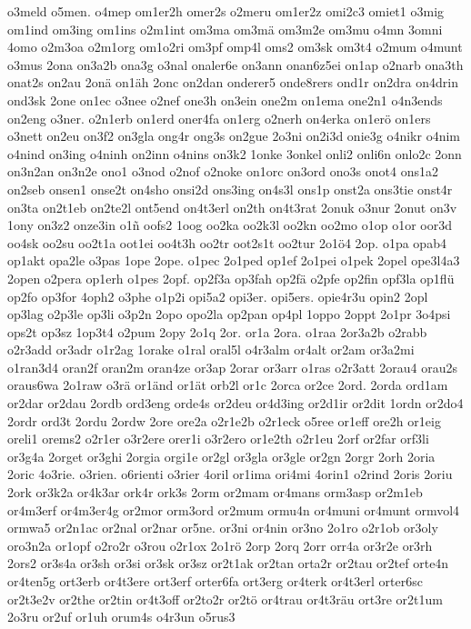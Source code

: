 {o3meld
o5men.
o4mep
om1er2h
omer2s
o2meru
om1er2z
omi2c3
omiet1
o3mig
om1ind
om3ing
om1ins
o2m1int
om3ma
om3mä
om3m2e
om3mu
o4mn
3omni
4omo
o2m3oa
o2m1org
om1o2ri
om3pf
omp4l
oms2
om3sk
om3t4
o2mum
o4munt
o3mus
2ona
on3a2b
ona3g
o3nal
onaler6e
on3ann
onan6z5ei
on1ap
o2narb
ona3th
onat2s
on2au
2onä
on1äh
2onc
on2dan
onderer5
onde8rers
ond1r
on2dra
on4drin
ond3sk
2one
on1ec
o3nee
o2nef
one3h
on3ein
one2m
on1ema
one2n1
o4n3ends
on2eng
o3ner.
o2n1erb
on1erd
oner4fa
on1erg
o2nerh
on4erka
on1erö
on1ers
o3nett
on2eu
on3f2
on3gla
ong4r
ong3s
on2gue
2o3ni
on2i3d
onie3g
o4nikr
o4nim
o4nind
on3ing
o4ninh
on2inn
o4nins
on3k2
1onke
3onkel
onli2
onli6n
onlo2c
2onn
on3n2an
on3n2e
ono1
o3nod
o2nof
o2noke
on1orc
on3ord
ono3s
onot4
ons1a2
on2seb
onsen1
onse2t
on4sho
onsi2d
ons3ing
on4s3l
ons1p
onst2a
ons3tie
onst4r
on3ta
on2t1eb
on2te2l
ont5end
on4t3erl
on2th
on4t3rat
2onuk
o3nur
2onut
on3v
1ony
on3z2
onze3in
o1ñ
oofs2
1oog
oo2ka
oo2k3l
oo2kn
oo2mo
o1op
o1or
oor3d
oo4sk
oo2su
oo2t1a
oot1ei
oo4t3h
oo2tr
oot2s1t
oo2tur
2o1ö4
2op.
o1pa
opab4
op1akt
opa2le
o3pas
1ope
2ope.
o1pec
2o1ped
op1ef
2o1pei
o1pek
2opel
ope3l4a3
2open
o2pera
op1erh
o1pes
2opf.
op2f3a
op3fah
op2fä
o2pfe
op2fin
opf3la
op1flü
op2fo
op3for
4oph2
o3phe
o1p2i
opi5a2
opi3er.
opi5ers.
opie4r3u
opin2
2opl
op3lag
o2p3le
op3li
o3p2n
2opo
opo2la
op2pan
op4pl
1oppo
2oppt
2o1pr
3o4psi
ops2t
op3sz
1op3t4
o2pum
2opy
2o1q
2or.
or1a
2ora.
o1raa
2or3a2b
o2rabb
o2r3add
or3adr
o1r2ag
1orake
o1ral
oral5l
o4r3alm
or4alt
or2am
or3a2mi
o1ran3d4
oran2f
oran2m
oran4ze
or3ap
2orar
or3arr
o1ras
o2r3att
2orau4
orau2s
oraus6wa
2o1raw
o3rä
or1änd
or1ät
orb2l
or1c
2orca
or2ce
2ord.
2orda
ord1am
or2dar
or2dau
2ordb
ord3eng
orde4s
or2deu
or4d3ing
or2d1ir
or2dit
1ordn
or2do4
2ordr
ord3t
2ordu
2ordw
2ore
ore2a
o2r1e2b
o2r1eck
o5ree
or1eff
ore2h
or1eig
oreli1
orems2
o2r1er
o3r2ere
orer1i
o3r2ero
or1e2th
o2r1eu
2orf
or2far
orf3li
or3g4a
2orget
or3ghi
2orgia
orgi1e
or2gl
or3gla
or3gle
or2gn
2orgr
2orh
2oria
2oric
4o3rie.
o3rien.
o6rienti
o3rier
4oril
or1ima
ori4mi
4orin1
o2rind
2oris
2oriu
2ork
or3k2a
or4k3ar
ork4r
ork3s
2orm
or2mam
or4mans
orm3asp
or2m1eb
or4m3erf
or4m3er4g
or2mor
orm3ord
or2mum
ormu4n
or4muni
or4munt
ormvol4
ormwa5
or2n1ac
or2nal
or2nar
or5ne.
or3ni
or4nin
or3no
2o1ro
o2r1ob
or3oly
oro3n2a
or1opf
o2ro2r
o3rou
o2r1ox
2o1rö
2orp
2orq
2orr
orr4a
or3r2e
or3rh
2ors2
or3s4a
or3sh
or3si
or3sk
or3sz
or2t1ak
or2tan
orta2r
or2tau
or2tef
orte4n
or4ten5g
ort3erb
or4t3ere
ort3erf
orter6fa
ort3erg
or4terk
or4t3erl
orter6sc
or2t3e2v
or2the
or2tin
or4t3off
or2to2r
or2tö
or4trau
or4t3räu
ort3re
or2t1um
2o3ru
or2uf
or1uh
orum4s
o4r3un
o5rus3
}
